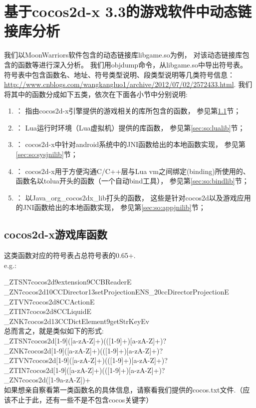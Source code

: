 \section{基于cocos2d-x 3.3的游戏软件中动态链接库分析}
我们以MoonWarriors软件包含的动态链接库libgame.so为例，
对该动态链接库包含的函数等进行深入分析。
我们用objdump命令，从libgame.so中导出符号表。
符号表中包含函数名、地址、符号类型说明、段类型说明等几类符号信息：\url{http://www.cnblogs.com/wangkangluo1/archive/2012/07/02/2572433.html}.
我们将其中的函数分成如下五类，依次在下面各小节中分别说明:
\begin{enumerate}
\item {}：
	指由cocos2d-x引擎提供的游戏相关的库所包含的函数，
	参见第\ref{sec:so:cocolib}节；
\item {}：
	Lua运行时环境（Lua虚拟机）提供的库函数，
	参见第\ref{sec:so:lualib}节；
\item {}：
	cocos2d-x中针对android系统中的JNI函数给出的本地函数实现，
	参见第\ref{sec:so:sysjnilib}节；
\item {}：
	cocos2d-x用于方便沟通C/C++层与Lua vm之间绑定(binding)所使用的、
	函数名以tolua开头的函数（一个自动bind工具），
	参见第\ref{sec:so:bindlib}节；
\item {}：
	以Java\_org\_cocos2dx\_lib打头的函数，
	这些是针对cocos2d以及游戏应用的JNI函数给出的本地函数实现，
	参见第\ref{sec:so:appjnilib}节；
\end{enumerate}

\subsection{cocos2d-x游戏库函数}
\label{sec:so:cocolib}
这类函数对应的符号表占总符号表的0.65+.\\
e.g.:

      \_ZTSN7cocos2d9extension9CCBReaderE\\
      \_ZN7cocos2d10CCDirector13setProjectionENS\_20ccDirectorProjectionE\\
      \_ZTVN7cocos2d8CCActionE\\
      \_ZTIN7cocos2d8CCLiquidE\\
      \_ZNK7cocos2d13CCDictElement9getStrKeyEv\\
总而言之，就是类似如下的形式:\\
	      \_ZTSN7cocos2d[1-9]([a-zA-Z]+)(([1-9]+)[a-zA-Z]+)?\\
	      \_ZNK7cocos2d[1-9]([a-zA-Z]+)(([1-9]+)[a-zA-Z]+)?\\
              \_ZTVN7cocos2d[1-9]([a-zA-Z]+)(([1-9]+)[a-zA-Z]+)?\\
              \_ZTIN7cocos2d[1-9]([a-zA-Z]+)(([1-9]+)[a-zA-Z]+)?\\
	      \_ZN7cocos2d([1-9a-zA-Z])+\\
如果想亲自察看第一类函数名的具体信息，请察看我们提供的cocos.txt文件.（应该不止于此，还有一些不是不包含cocos关键字）\\

